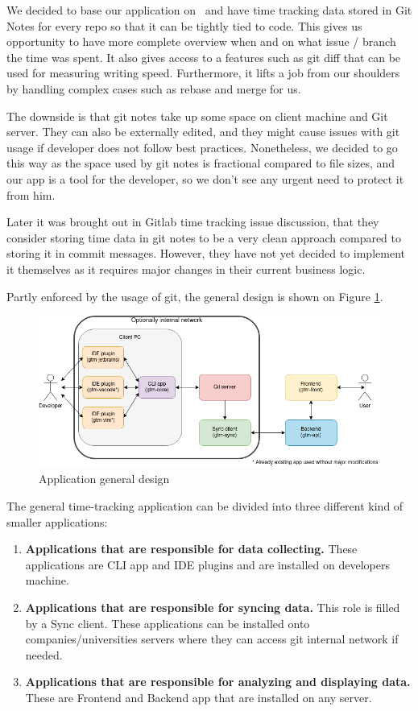 We decided to base our application on~ and have time tracking data stored in Git Notes for every repo so that it can be tightly tied to code.
This gives us opportunity to have more complete overview when and on what issue / branch the time was spent.
It also gives access to a features such as git diff that can be used for measuring writing speed.
Furthermore, it lifts a job from our shoulders by handling complex cases such as rebase and merge for us.

The downside is that git notes take up some space on client machine and Git server.
They can also be externally edited, and they might cause issues with git usage if developer does not follow best practices.
Nonetheless, we decided to go this way as the space used by git notes is fractional compared to file sizes, and our app is a tool for the developer,
so we don't see any urgent need to protect it from him.

Later it was brought out in Gitlab time tracking issue discussion, that they consider storing time data in git notes
to be a very clean approach compared to storing it in commit messages.
However, they have not yet decided to implement it themselves as it requires major changes in their current business logic.
\cite{gitlab-time-issue}

Partly enforced by the usage of git, the general design is shown on Figure
\ref{fig:project-archidecture}.

\begin{figure}[h]
    \includegraphics[width=\textwidth]{figures/project_archidecture}
    \caption{Application general design}
    \label{fig:project-archidecture}
\end{figure}

The general time-tracking application can be divided into three different kind of smaller applications:
\begin{enumerate}
    \item \textbf{Applications that are responsible for data collecting.} These applications are CLI app and IDE plugins and are installed on developers machine.
    \item \textbf{Applications that are responsible for syncing data.} This role is filled by a Sync client.
    These applications can be installed onto companies/universities servers where they can access git internal network if needed.
    \item \textbf{Applications that are responsible for analyzing and displaying data.} These are Frontend and Backend app that are installed on any server.
\end{enumerate}

